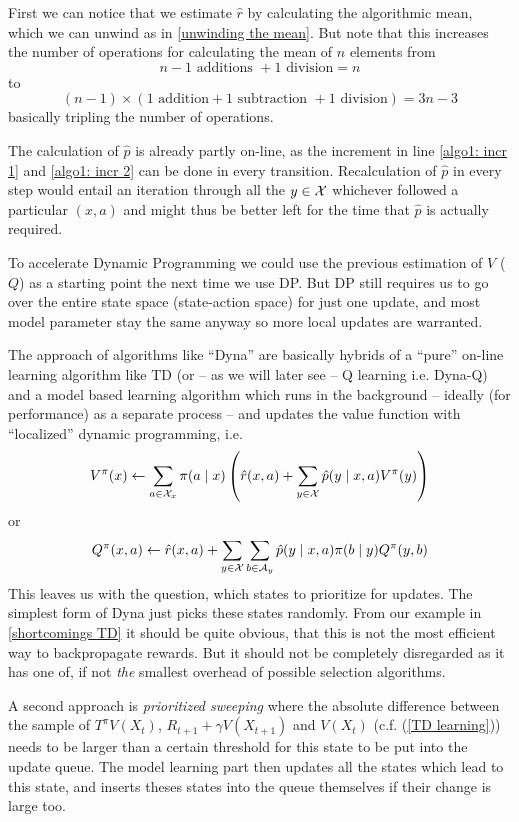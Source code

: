 First we can notice that we estimate \(\hat{r}\) by calculating the algorithmic mean, which we can unwind as in \ref{unwinding the mean}. But note that this increases the number of operations for calculating the mean of \(n\) elements from 
\[
	n-1 \text{ additions } + 1\text{ division} = n
\]
to 
\[
	(n-1) \times (1\text{ addition} + 1 \text{ subtraction } + 1\text{ division})=3n - 3 
\]
basically tripling the number of operations. 

The calculation of \(\hat{p}\) is already partly on-line, as the increment  in line \ref{algo1: incr 1} and \ref{algo1: incr 2} can be done in every transition. Recalculation of  \(\hat{p}\) in every step would entail an iteration through all the \(y\in\mathcal{X}\) whichever followed a particular \((x,a)\) and might thus be better left for the time that \(\hat{p}\) is actually required.

To accelerate Dynamic Programming we could use the previous estimation of \(V\) (\(Q\)) as a starting point the next time we use DP. But DP still requires us to go over the entire state space (state-action space) for just one update, and most model parameter stay the same anyway so more local updates are warranted.

The approach of algorithms like ``Dyna'' are basically hybrids of a ``pure'' on-line learning algorithm like TD (or -- as we will later see -- Q learning i.e. Dyna-Q) and a model based learning algorithm which runs in the background -- ideally (for performance) as a separate process -- and updates the value function with ``localized'' dynamic programming, i.e.
\begin{align}
	\label{async DP V}
	V^\pi(x) \gets \sum_{a\in\mathcal{X}_x}\pi(a\mid x) \left( \hat{r}(x,a) + \sum_{y\in\mathcal{X}} \hat{p}(y\mid x,a) V^\pi(y)\right)
\end{align}
or
\begin{align}\label{async DP Q}
	Q^\pi(x,a) \gets \hat{r}(x,a) + \sum_{y\in\mathcal{X}}\sum_{b\in\mathcal{A}_y} \hat{p}(y\mid x,a) \pi(b\mid y) Q^\pi(y,b)
\end{align}
This leaves us with the question, which states to prioritize for updates. The simplest form of Dyna just picks these states randomly. From our example in \ref{shortcomings TD} it should be quite obvious, that this is not the most efficient way to backpropagate rewards. But it should not be completely disregarded as it has one of, if not \emph{the} smallest overhead of possible selection algorithms. 

A second approach is \emph{prioritized sweeping} where the absolute difference between the sample of \(T^\pi V(X_t)\), \(R_{t+1}+\gamma V(X_{t+1})\) and \(V(X_t)\) (c.f. (\ref{TD learning})) needs to be larger than a certain threshold for this state to be put into the update queue. The model learning part then updates all the states which lead to this state, and inserts theses states into the queue themselves if their change is large too. 

